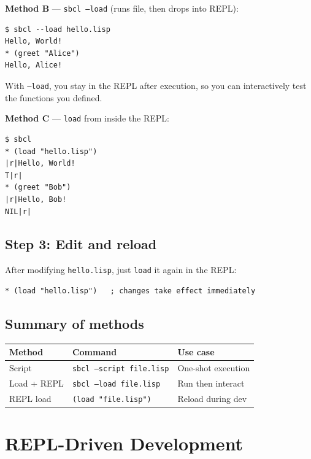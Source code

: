\documentclass[a4paper,11pt]{article}
\newcommand{\file}[1]{\texttt{#1}}
\begin{document}
\textbf{Method B} --- \texttt{sbcl --load} (runs file, then drops into REPL):

\begin{lstlisting}[style=shell]
$ sbcl --load hello.lisp
Hello, World!
* (greet "Alice")
Hello, Alice!
\end{lstlisting}

With \texttt{--load}, you stay in the REPL after execution,
so you can interactively test the functions you defined.

\textbf{Method C} --- \texttt{load} from inside the REPL:

\begin{lstlisting}[style=repl]
$ sbcl
* (load "hello.lisp")
|r|Hello, World!
T|r|
* (greet "Bob")
|r|Hello, Bob!
NIL|r|
\end{lstlisting}

\subsection{Step 3: Edit and reload}

After modifying \file{hello.lisp}, just \texttt{load} it again in the REPL:

\begin{lstlisting}[style=repl]
* (load "hello.lisp")   ; changes take effect immediately
\end{lstlisting}

\subsection{Summary of methods}

\begin{center}
\begin{tabular}{lll}
  \toprule
  \textbf{Method} & \textbf{Command} & \textbf{Use case} \\
  \midrule
  Script        & \texttt{sbcl --script file.lisp} & One-shot execution \\
  Load + REPL   & \texttt{sbcl --load file.lisp}   & Run then interact \\
  REPL load     & \texttt{(load "file.lisp")}      & Reload during dev \\
  \bottomrule
\end{tabular}
\end{center}

\section{REPL-Driven Development}
\end{document}
